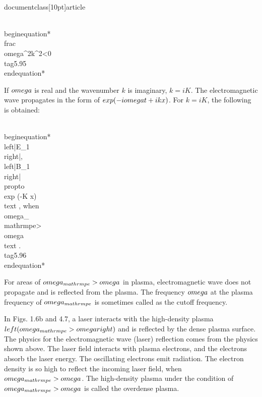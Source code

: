 \\documentclass[10pt]{article}
\begin{document}
{{{{\\begin{equation*}
\\frac{\\omega^{2}}{k^{2}}<0 \\tag{5.95}
\\end{equation*}


If $\\omega$ is real and the wavenumber $k$ is imaginary, $k=i K$. The electromagnetic wave propagates in the form of $\\exp (-i \\omega t+i k x)$. For $k=i K$, the following is obtained:


\\begin{equation*}
\\left|E_{1}\\right|,\\left|B_{1}\\right| \\propto \\exp (-K x) \\text {, when } \\omega_{\\mathrm{pe}}>\\omega \\text {. } \\tag{5.96}
\\end{equation*}


For areas of $\\omega_{\\mathrm{pe}}>\\omega$ in plasma, electromagnetic wave does not propagate and is reflected from the plasma. The frequency $\\omega$ at the plasma frequency of $\\omega_{\\mathrm{pe}}$ is sometimes called as the cutoff frequency.

In Figs. 1.6b and 4.7, a laser interacts with the high-density plasma $\\left(\\omega_{\\mathrm{pe}}>\\omega\\right)$ and is reflected by the dense plasma surface. The physics for the electromagnetic wave (laser) reflection comes from the physics shown above. The laser field interacts with plasma electrons, and the electrons absorb the laser energy. The oscillating electrons emit radiation. The electron density is so high to reflect the incoming laser field, when $\\omega_{\\mathrm{pe}}>\\omega$. The high-density plasma under the condition of $\\omega_{\\mathrm{pe}}>\\omega$ is called the overdense plasma.

}}}}
\end{document}
